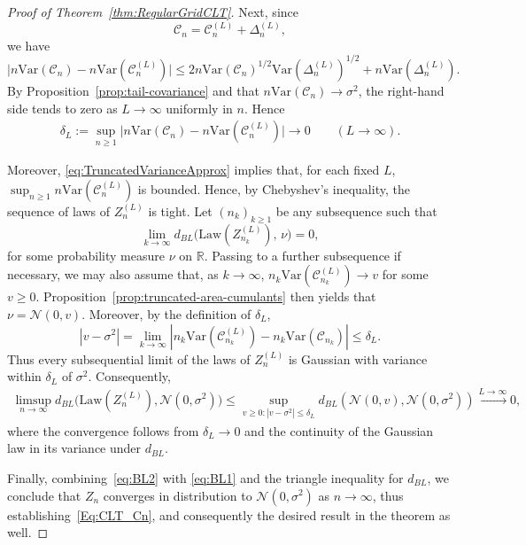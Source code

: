 \documentclass[11pt]{article}
\newcommand{\var}{\mathrm{Var}}
\begin{document}
\begin{proof}[Proof of Theorem~\ref{thm:RegularGridCLT}]
Next, since
\[
\mathscr{C}_n=\mathscr{C}_n^{(L)}+\Delta_n^{(L)},
\]
we have
\[
\bigl|n\var(\mathscr{C}_n)-n\var(\mathscr{C}_n^{(L)})\bigr|
\le
2 n\var(\mathscr{C}_n)^{1/2}\var(\Delta_n^{(L)})^{1/2}
+
n\var(\Delta_n^{(L)}).
\]
By Proposition~\ref{prop:tail-covariance} and that $n \var(\mathscr{C}_n) \to \sigma^2$, the right-hand side tends to zero as $L \to \infty$ uniformly in $n$. Hence 
\begin{align}
\delta_L := \sup_{n \geq 1}\bigl|n\var(\mathscr{C}_n)-n\var(\mathscr{C}_n^{(L)})\bigr| \to 0 \qquad (L \to \infty). \label{eq:TruncatedVarianceApprox}
\end{align}

Moreover, \eqref{eq:TruncatedVarianceApprox} implies that, for each fixed $L$, $\sup_{n \geq1} n\var(\mathscr{C}_n^{(L)})$ is bounded. Hence, by Chebyshev's inequality, the sequence of laws of $Z_n^{(L)}$ is tight. Let $(n_k)_{k \geq 1}$ be any subsequence such that 
\[
\lim_{k \to \infty} d_{BL}\bigl(\mathrm{Law}(Z_{n_k}^{(L)}), \, \nu\bigr) = 0,
\]
for some probability measure $\nu$ on $\mathbb R$. Passing to a further subsequence if necessary, we may also assume that, as $k \to \infty$, $n_k\var(\mathscr{C}_{n_k}^{(L)}) \to v$ for some $v \geq 0$. Proposition~\ref{prop:truncated-area-cumulants} then yields that $\nu = \mathcal{N}(0,v)$. Moreover, by the definition of $\delta_L$,
\[
|v-\sigma^2| = \lim_{k \to \infty}|n_k \mathrm{Var}(\mathscr{C}_{n_k}^{(L)}) - n_k \mathrm{Var}(\mathscr{C}_{n_k})|\leq \delta_L.
\]
Thus every subsequential limit of the laws of $Z_n^{(L)}$ is Gaussian with variance within $\delta_L$ of $\sigma^2$. Consequently,
\begin{align}
\limsup_{n \to \infty} d_{BL}\bigl(\mathrm{Law}(Z_n^{(L)}), \mathcal{N}(0, \sigma^2)\bigr) 
\leq \sup_{v\geq 0: |v-\sigma^2|\leq \delta_L} d_{BL}(\mathcal{N}(0,v), \mathcal{N}(0, \sigma^2)) 
\xrightarrow{L \to \infty} 0, \label{eq:BL2}
\end{align}
where the convergence follows from $\delta_L\to 0$ and the continuity of the Gaussian law in its variance under $d_{BL}$.

Finally, combining~\eqref{eq:BL2} with \eqref{eq:BL1} and the triangle inequality for $d_{BL}$, we conclude that $Z_n$ converges in distribution to $\mathcal{N}(0, \sigma^2)$ as $n \to \infty$, thus establishing~\eqref{Eq:CLT_Cn}, and consequently the desired result in the theorem as well. 
\end{proof}



\end{document}
